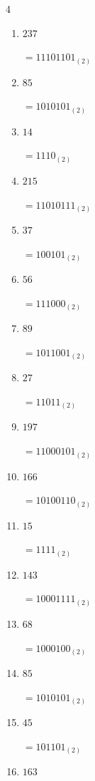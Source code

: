 \begin{multicols}{4}
\begin{enumerate}
        $=11111101_{(2)}$

  \item $237$

        $=11101101_{(2)}$

  \item $85$

        $=1010101_{(2)}$

  \item $14$

        $=1110_{(2)}$

  \item $215$

        $=11010111_{(2)}$

\columnbreak %

  \item $37$

        $=100101_{(2)}$

  \item $56$

        $=111000_{(2)}$

  \item $89$

        $=1011001_{(2)}$

  \item $27$

        $=11011_{(2)}$

  \item $197$

        $=11000101_{(2)}$

  \item $166$

        $=10100110_{(2)}$

  \item $15$

        $=1111_{(2)}$

  \item $143$

        $=10001111_{(2)}$

  \item $68$

        $=1000100_{(2)}$

  \item $85$

        $=1010101_{(2)}$

  \item $45$

        $=101101_{(2)}$

  \item $163$


\end{enumerate}
\end{multicols}
